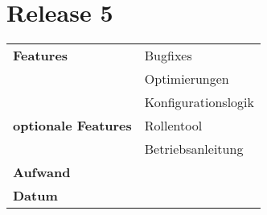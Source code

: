 \section*{Release 5}
\label{sec:release_5}

\begin{tabular}{p{5cm} p{9cm}}
    \textbf{Features} &  Bugfixes \\
    & Optimierungen \\
    & Konfigurationslogik \\
    \textbf{optionale Features} &  Rollentool \\
    & Betriebsanleitung \\
    \hline
    \textbf{Aufwand} & \\
    \hline
    \textbf{Datum} & 
\end{tabular}